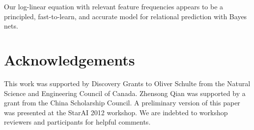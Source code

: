 \documentclass[runningheads,a4paper]{llncs}
\begin{document}
Our log-linear equation with relevant feature frequencies appears to be a principled, fast-to-learn, and accurate model for relational prediction with Bayes nets.




\section*{Acknowledgements} This work was supported by Discovery Grants to Oliver Schulte from the Natural Science and Engineering Council of Canada. Zhensong Qian was supported by a grant from the China Scholarship Council. A preliminary version of this paper was presented at the StarAI 2012 workshop. We are indebted to workshop reviewers and participants for helpful comments.


\end{document}
